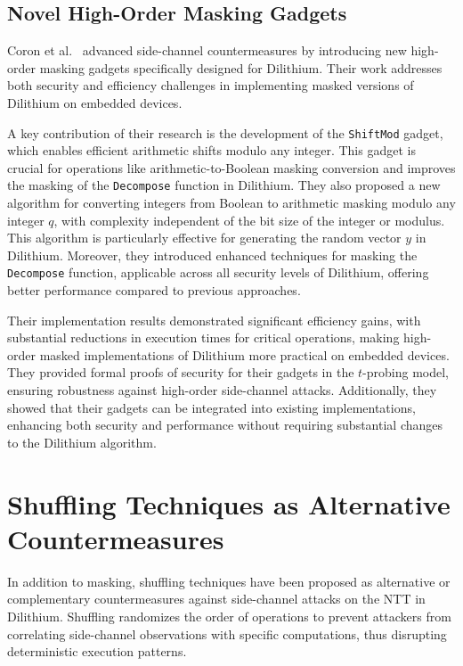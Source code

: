 \subsection{Novel High-Order Masking Gadgets}

Coron et al.~\cite{Coron23} advanced side-channel countermeasures by introducing new high-order masking gadgets specifically designed for Dilithium. Their work addresses both security and efficiency challenges in implementing masked versions of Dilithium on embedded devices.

A key contribution of their research is the development of the \texttt{ShiftMod} gadget, which enables efficient arithmetic shifts modulo any integer. This gadget is crucial for operations like arithmetic-to-Boolean masking conversion and improves the masking of the \texttt{Decompose} function in Dilithium. They also proposed a new algorithm for converting integers from Boolean to arithmetic masking modulo any integer $q$, with complexity independent of the bit size of the integer or modulus. This algorithm is particularly effective for generating the random vector $y$ in Dilithium. Moreover, they introduced enhanced techniques for masking the \texttt{Decompose} function, applicable across all security levels of Dilithium, offering better performance compared to previous approaches.

Their implementation results demonstrated significant efficiency gains, with substantial reductions in execution times for critical operations, making high-order masked implementations of Dilithium more practical on embedded devices. They provided formal proofs of security for their gadgets in the $t$-probing model, ensuring robustness against high-order side-channel attacks. Additionally, they showed that their gadgets can be integrated into existing implementations, enhancing both security and performance without requiring substantial changes to the Dilithium algorithm.


\section{Shuffling Techniques as Alternative Countermeasures}

In addition to masking, shuffling techniques have been proposed as alternative or complementary countermeasures against side-channel attacks on the \ac{NTT} in Dilithium. Shuffling randomizes the order of operations to prevent attackers from correlating side-channel observations with specific computations, thus disrupting deterministic execution patterns.

